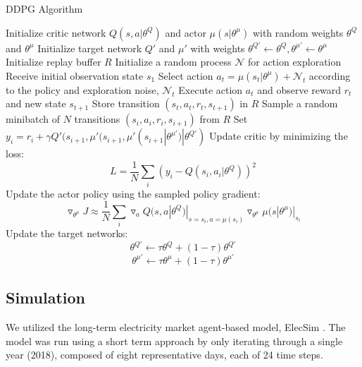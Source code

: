 \begin{algorithm}
	\caption{DDPG Algorithm \cite{Hunt2016a}}
	\begin{algorithmic}[1]
		\small
		\State Initialize critic network $Q(s,a|\theta^Q)$ and actor $\mu(s|\theta^\mu)$ with random weights $\theta^Q$ and $\theta^\mu$
		\State Initialize target network $Q'$ and $\mu'$ with weights $\theta^{Q'}\leftarrow\theta^Q,\theta^{\mu'}\leftarrow \theta^{\mu}$
		\State Initialize replay buffer $R$
		\State Initialize a random process $\mathcal{N}$ for action exploration
		\State Receive initial observation state $s_1$
		\State Select action $a_t=\mu(s_t|\theta^{\mu})+\mathcal{N}_t$ according to the policy and exploration noise, $\mathcal{N}_t$
		\State Execute action $a_t$ and observe reward $r_t$ and new state $s_{t+1}$
		\State Store transition $(s_t, a_t, r_t, s_{t+1})$ in $R$
		\State Sample a random minibatch of $N$ transitions $(s_i, a_i, r_i, s_{i+1})$ from $R$
		\State Set $y_i=r_i+\gamma Q'(s_{i+1},\mu'(s_{i+1},\mu'(s_{i+1}|\theta^{\mu'})|\theta^{Q'})$
		\State Update critic by minimizing the loss: $$L=\frac{1}{N}\sum_i(y_i-Q(s_i,a_i|\theta^Q))^2$$
		\State Update the actor policy using the sampled policy gradient: $$\triangledown_{\theta^\mu}J\approx \frac{1}{N}\sum_i\triangledown_a Q(s,a|\theta^Q)|_{s=s_i,a=\mu(s_i)}\triangledown_{\theta^\mu}\mu(s|\theta^\mu)|_{s_i}$$
		\State Update the target networks:
		$$\theta^{Q'}\leftarrow\tau\theta^Q+(1-\tau)\theta^{Q'}$$
		$$\theta^{\mu'}\leftarrow\tau\theta^\mu+(1-\tau)\theta^{\mu'}$$
		\EndFor
		\EndFor
	\end{algorithmic}
	\label{alg:ddpg}
\end{algorithm}

\subsection{Simulation}

We utilized the long-term electricity market agent-based model, ElecSim \cite{Kell,Kell2020}. The model was run using a short term approach by only iterating through a single year (2018), composed of eight representative days, each of 24 time steps.





